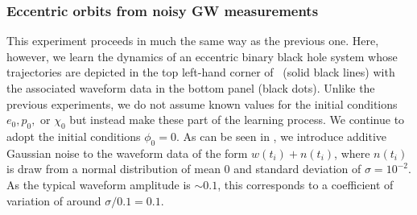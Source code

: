 \documentclass[ reprint,
nofootinbib,
 amsmath,amssymb,
 aps,
]{revtex4-2}
\begin{document}
\subsubsection{Eccentric orbits from noisy GW measurements} \label{ssub:low_eccentricity_orbit}

This experiment proceeds in much the same way as the previous one.
Here, however, we learn the dynamics of an eccentric binary black hole 
system whose trajectories are depicted in the top left-hand corner of~ (solid black lines) with the associated waveform data in the bottom panel (black dots).
Unlike the previous experiments, we do not assume known values for the initial conditions $e_0,p_0,$ or $\chi_0$ but instead 
make these part of the learning process. We continue to adopt the initial conditions $\phi_0 = 0$.
As can be seen in , we introduce additive Gaussian noise to the waveform data of the form
$w(t_i) + n(t_i)$, where $n(t_i)$ is draw from a normal distribution of mean 0 and standard deviation of $\sigma = 10^{-2}$. 
As the typical waveform amplitude is $\sim 0.1$, this corresponds to a coefficient of variation of around $\sigma/0.1 = 0.1$.
\end{document}
